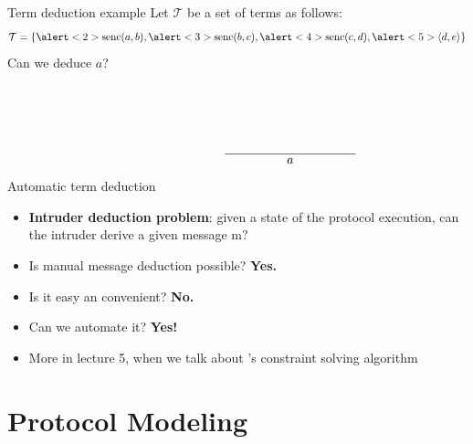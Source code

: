 \documentclass[11pt,aspectratio=169]{beamer}
\begin{document}
\begin{frame}[t]{Term deduction example}
    Let $\mathcal{T}$ be a set of terms as follows:
    {
    \begin{equation*}
        \mathcal{T} = \{
            \alert<2>{\senc(a, b)},
            \alert<3>{\senc(b, c)},
            \alert<4>{\senc(c, d)},
            \alert<5>{\langle d, e \rangle}
        \}
    \end{equation*}}
    Can we deduce $a$? 
    \begin{equation*}
        \begin{prooftree}
            \only<-5>{}\hypo{\langle d, e \rangle}
            \only<-4>{\rewrite{}}\infer1{d}
            \only<-3>{\rewrite{}}\hypo{\senc(c, d)}
            \only<-3>{\rewrite{}}\infer2{c}
            \only<-2>{\rewrite{}}\hypo{\senc(b, c)}
            \only<-2>{\rewrite{}}\infer2{b}
            \only<-1>{\rewrite{}}\hypo{\senc(a, b)}
            \only<-1>{\rewrite{}}\infer2{a}
        \end{prooftree}
    \end{equation*}
\end{frame}

\begin{frame}[fragile]{Automatic term deduction}
    \begin{itemize}
        \item \textbf{Intruder deduction problem}:
              given a state of the protocol execution, can the intruder derive 
              a given message m?
        \item Is manual message deduction possible? \textbf{Yes.}
        \item Is it easy an convenient? \textbf{No.}
        \item Can we automate it? \textbf{Yes!}
        \item More in lecture 5, when we talk about \Tamarin's constraint 
              solving algorithm
    \end{itemize}
\end{frame}


\section{Protocol Modeling}

\end{document}
